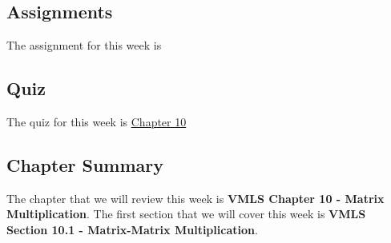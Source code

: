 \subsection{Assignments}

The assignment for this week is   

\subsection{Quiz}

The quiz for this week is \href{https://applied.cs.colorado.edu/mod/quiz/view.php?id=50797}{Chapter 10} \textbullet {}  

\subsection{Chapter Summary}

The chapter that we will review this week is \textbf{VMLS Chapter 10 - Matrix Multiplication}. The first section that we will cover this week is \textbf{VMLS Section 10.1 - Matrix-Matrix Multiplication}.

